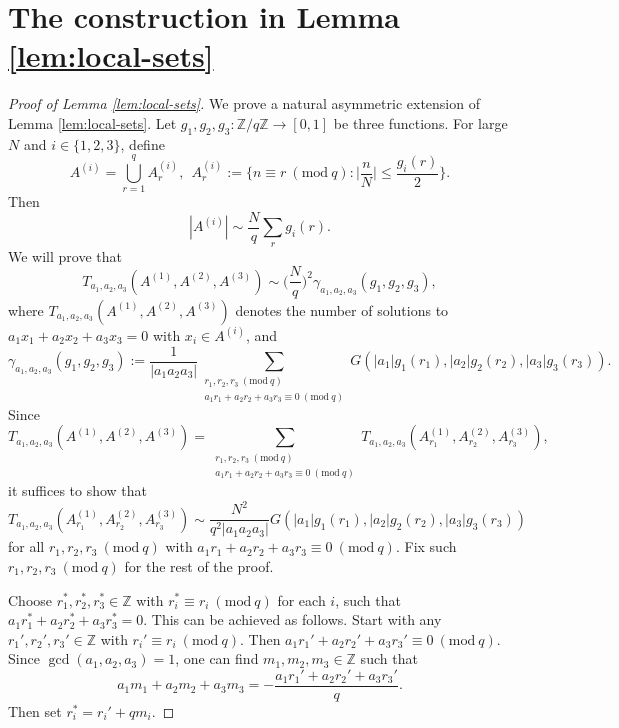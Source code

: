 \documentclass[12pt, notitlepage]{amsart}
\numberwithin{equation}{section}
\def\Z{\mathbb Z}
\def\gcd{\operatorname{gcd}}
\newcommand{\Mod}[1]{\ (\mathrm{mod}\ #1)}
\theoremstyle{remark}
\theoremstyle{definition}
\theoremstyle{remark}
\numberwithin{equation}{section}
\begin{document}
\section{The construction in Lemma \ref{lem:local-sets}}\label{sec:local}


\begin{proof}[Proof of Lemma \ref{lem:local-sets}]
We prove a natural asymmetric extension of Lemma \ref{lem:local-sets}. Let $g_1,g_2,g_3: \Z/q\Z \rightarrow [0,1]$ be three functions. For large $N$ and $i \in \{1,2,3\}$, define
$$
A^{(i)} = \bigcup_{r=1}^q A_r^{(i)}, \ \ A_r^{(i)} := \Big\{n \equiv r\Mod{q}: \Big|\frac{n}{N}\Big| \leq \frac{g_i(r)}{2}\Big\}.
$$
Then
$$
|A^{(i)}| \sim  \frac{N}{q} \sum_r g_i(r).
$$
We will prove that
\begin{equation}\label{eq:local-sets-1}
T_{a_1,a_2,a_3}(A^{(1)}, A^{(2)}, A^{(3)}) \sim \Big(\frac{N}{q}\Big)^2 \gamma_{a_1,a_2,a_3}(g_1,g_2,g_3),
\end{equation}
where $T_{a_1,a_2,a_3}(A^{(1)}, A^{(2)}, A^{(3)})$ denotes the number of solutions to $a_1x_1 + a_2x_2 + a_3x_3 = 0$ with $x_i \in A^{(i)}$, and 
$$
\gamma_{a_1,a_2,a_3}(g_1,g_2,g_3) := \frac{1}{|a_1a_2a_3|} \sum_{\substack{r_1,r_2,r_3\Mod{q} \\ a_1r_1+a_2r_2+a_3r_3\equiv 0\Mod{q}}} G(|a_1|g_1(r_1), |a_2|g_2(r_2), |a_3|g_3(r_3)).
$$
Since
$$
T_{a_1,a_2,a_3}(A^{(1)}, A^{(2)}, A^{(3)}) = \sum_{\substack{r_1,r_2,r_3\Mod{q} \\ a_1r_1+a_2r_2+a_3r_3\equiv 0\Mod{q}}} T_{a_1,a_2,a_3}(A^{(1)}_{r_1}, A^{(2)}_{r_2}, A^{(3)}_{r_3}),
$$
it suffices to show that
\begin{equation}\label{eq:local-sets-2}
 T_{a_1,a_2,a_3}(A^{(1)}_{r_1}, A^{(2)}_{r_2}, A^{(3)}_{r_3}) \sim \frac{N^2}{q^2|a_1a_2a_3|}  G(|a_1|g_1(r_1), |a_2|g_2(r_2), |a_3|g_3(r_3))
\end{equation}
for all $r_1,r_2,r_3\Mod{q}$ with $a_1r_1+a_2r_2+a_3r_3 \equiv 0\Mod{q}$. Fix such $r_1,r_2,r_3\Mod{q}$ for the rest of the proof.

Choose $r_1^*,r_2^*,r_3^*\in\Z$ with $r_i^*\equiv r_i\Mod{q}$ for each $i$, such that $a_1r_1^*+a_2r_2^*+a_3r_3^*=0$. This can be achieved as follows. Start with any $r_1',r_2',r_3'\in\Z$ with $r_i'\equiv r_i\Mod{q}$. Then $a_1r_1'+a_2r_2'+a_3r_3'\equiv 0\Mod{q}$. Since $\gcd(a_1,a_2,a_3)=1$, one can find $m_1,m_2,m_3 \in \Z$ such that 
$$
a_1m_1+a_2m_2+a_3m_3 = -\frac{a_1r_1'+a_2r_2'+a_3r_3'}{q}.
$$
Then set $r_i^* = r_i' + qm_i$.


\end{proof}
\end{document}
